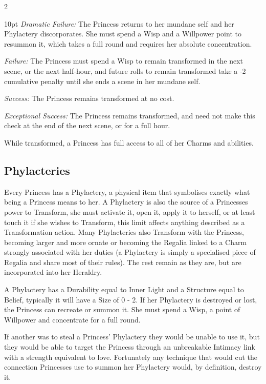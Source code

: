 \begin{multicols}{2}
\begin{myindentpar}{10pt}
    \emph{Dramatic Failure:} The Princess returns to her mundane self and her Phylactery discorporates. She must spend a Wisp and a Willpower point to resummon it, which takes a full round and requires her absolute concentration. 
    
    \emph{Failure:} The Princess must spend a Wisp to remain transformed in the next scene, or the next half-hour, and future rolls to remain transformed take a -2 cumulative penalty until she ends a scene in her mundane self. 
    
    \emph{Success:} The Princess remains transformed at no cost. 
    
    \emph{Exceptional Success:} The Princess remains transformed, and need not make this check at the end of the next scene, or for a full hour. 
\end{myindentpar}

While transformed, a Princess has full access to all of her Charms and abilities. 

\subsection*{Phylacteries}

Every Princess has a Phylactery, a physical item that symbolises exactly what being a Princess means to her. A Phylactery is also the source of a Princesses power to Transform, she must activate it, open it, apply it to herself, or at least touch it if she wishes to Transform, this limit affects anything described as a Transformation action. Many Phylacteries also Transform with the Princess, becoming larger and more ornate or becoming the Regalia linked to a Charm strongly associated with her duties (a Phylactery is simply a specialised piece of Regalia and share most of their rules). The rest remain as they are, but are incorporated into her Heraldry. 

A Phylactery has a Durability equal to Inner Light and a Structure equal to Belief, typically it will have a Size of 0 - 2. If her Phylactery is destroyed or lost, the Princess can recreate or summon it. She must spend a Wisp, a point of Willpower and concentrate for a full round. 

If another was to steal a Princess' Phylactery they would be unable to use it, but they would be able to target the Princess through an unbreakable Intimacy link with a strength equivalent to love. Fortunately any technique that would cut the connection Princesses use to summon her Phylactery would, by definition, destroy it.


\end{multicols}
